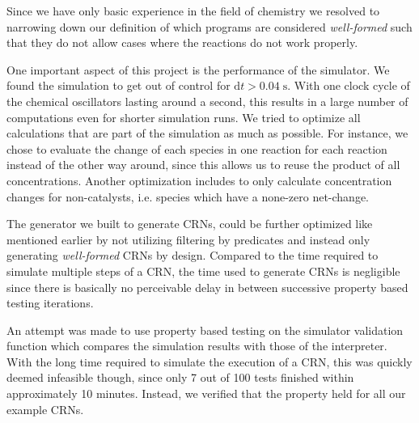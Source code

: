 Since we have only basic experience in the field of chemistry we resolved to narrowing down our definition of which programs are considered \textit{well-formed} such that they do not allow cases where the reactions do not work properly.

One important aspect of this project is the performance of the simulator. We found the simulation to get out of control for $\mathrm{d}t > 0.04\;\mathrm{s}$. With one clock cycle of the chemical oscillators lasting around a second, this results in a large number of computations even for shorter simulation runs. We tried to optimize all calculations that are part of the simulation as much as possible. For instance, we chose to evaluate the change of each species in one reaction for each reaction instead of the other way around, since this allows us to reuse the product of all concentrations. Another optimization includes to only calculate concentration changes for non-catalysts, i.e. species which have a none-zero net-change.

The generator we built to generate CRNs, could be further optimized like mentioned earlier by not utilizing filtering by predicates and instead only generating \textit{well-formed} CRNs by design. Compared to the time required to simulate multiple steps of a CRN, the time used to generate CRNs is negligible since there is basically no perceivable delay in between successive property based testing iterations.

An attempt was made to use property based testing on the simulator validation function which compares the simulation results with those of the interpreter. With the long time required to simulate the execution of a CRN, this was quickly deemed infeasible though, since only 7 out of 100 tests finished within approximately 10 minutes. Instead, we verified that the property held for all our example CRNs.

